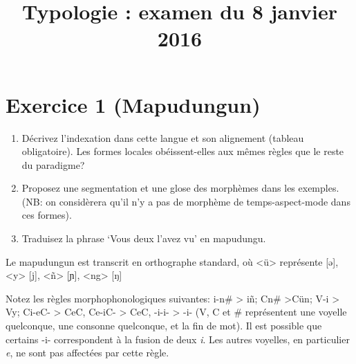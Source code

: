 \documentclass[oldfontcommands,twoside,a4paper,12pt]{article}
\begin{document}
\title{Typologie : examen du 8 janvier 2016}
\date{}
\maketitle
 

\section*{Exercice 1 (Mapudungun)}

\begin{enumerate}
\item Décrivez l'indexation dans cette langue et son alignement (tableau obligatoire). Les formes locales obéissent-elles aux mêmes règles que le reste du paradigme?
\item Proposez une segmentation et une glose des morphèmes dans les exemples. (NB: on considèrera qu'il n'y a pas de morphème de temps-aspect-mode dans ces formes).
\item Traduisez la phrase `Vous deux l'avez vu' en mapudungu.
\end{enumerate}
Le mapudungun est transcrit en orthographe standard, où <ü> représente [ə], <y> [j], <ñ> [ɲ], <ng> [ŋ]

Notez les règles morphophonologiques suivantes: i-n\# > iñ; Cn\# >Cün; V-i > Vy; Ci-eC- > CeC, Ce-iC- > CeC, -i-i- > -i- (V, C et \# représentent une voyelle quelconque, une consonne quelconque, et la fin de mot). Il est possible que certains -i- correspondent à la fusion de deux \textit{i}. Les autres voyelles, en particulier \textit{e}, ne sont pas affectées par cette règle.
\end{document}
